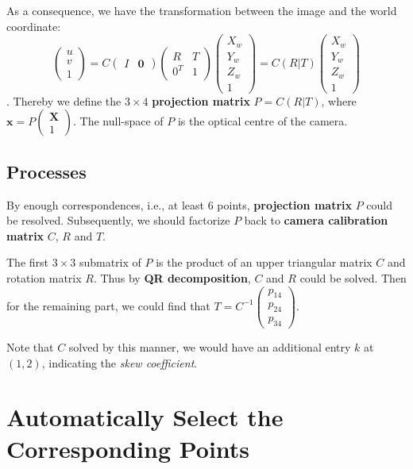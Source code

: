 \documentclass[12pt, a4paper]{article}
\begin{document}
As a consequence, we have the transformation between the image and the world coordinate: $$\begin{pmatrix}u\\v\\1\end{pmatrix}=C\begin{pmatrix}I&\mathbf{0}\end{pmatrix}\begin{pmatrix}R&T\\0^T&1\end{pmatrix}\begin{pmatrix}X_w\\Y_w\\Z_w\\1\end{pmatrix}=C(R|T)\begin{pmatrix}X_w\\Y_w\\Z_w\\1\end{pmatrix}$$. Thereby we define the $3\times4$ \textbf{projection matrix} $P=C(R|T)$, where $\mathbf{x}=P\begin{pmatrix}\mathbf{X}\\1\end{pmatrix}$. The null-space of $P$ is the optical centre of the camera.

\subsection{Processes}

By enough correspondences, i.e., at least 6 points, \textbf{projection matrix} $P$ could be resolved. Subsequently, we should factorize $P$ back to \textbf{camera calibration matrix} $C$, $R$ and $T$.

The first $3\times3$ submatrix of $P$ is the product of an upper triangular matrix $C$ and rotation matrix $R$. Thus by \textbf{QR decomposition}, $C$ and $R$ could be solved. Then for the remaining part, we could find that $T=C^{-1}\begin{pmatrix}p_{14}\\p_{24}\\p_{34}\end{pmatrix}$.

Note that $C$ solved by this manner, we would have an additional entry $k$ at $(1,2)$, indicating the \emph{skew coefficient}.

\section{Automatically Select the Corresponding Points}
\end{document}

